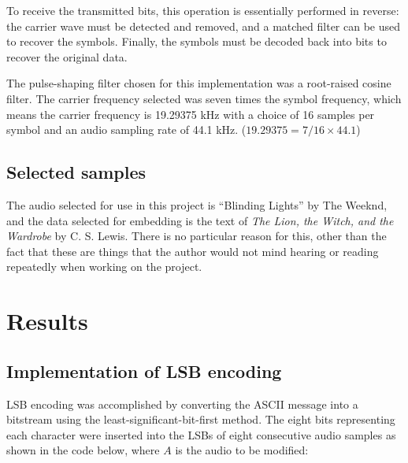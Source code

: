 \documentclass{article}
\begin{document}
\vspace{6pt}

To receive the transmitted bits, this operation is essentially performed in
reverse: the carrier wave must be detected and removed, and a matched filter can
be used to recover the symbols. Finally, the symbols must be decoded back into
bits to recover the original data.

\vspace{6pt}

The pulse-shaping filter chosen for this implementation was a root-raised cosine
filter. The carrier frequency selected was seven times the symbol frequency,
which means the carrier frequency is 19.29375 kHz with a choice of 16 samples per
symbol and an audio sampling rate of 44.1 kHz. ($19.29375 = 7/16 \times 44.1$)

\subsection{Selected samples}

The audio selected for use in this project is ``Blinding Lights'' by The Weeknd,
and the data selected for embedding is the text of 
\textit{The Lion, the Witch, and the Wardrobe} by C. S. Lewis. There is no
particular reason for this, other than the fact that these are things that the
author would not mind hearing or reading repeatedly when working on the project.

\section{Results}

\subsection{Implementation of LSB encoding}

LSB encoding was accomplished by converting the ASCII message into a bitstream
using the least-significant-bit-first method. The eight bits representing each
character were inserted into the LSBs of eight consecutive audio samples as
shown in the code below, where $A$ is the audio to be modified:

\inputminted[xleftmargin=24pt, linenos=true, breaklines, firstline=26, lastline=33]{matlab}{src/encode_message_LSB.m}
\end{document}
